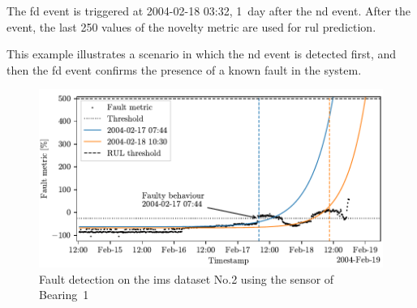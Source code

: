 The \gls{fd} event is triggered at 2004-02-18 03:32, 1~day after the \gls{nd} event. After the event, the last 250 values of the novelty metric are used for \gls{rul} prediction. 

This example illustrates a scenario in which the \gls{nd} event is detected first, and then the \gls{fd} event confirms the presence of a known fault in the system.

\begin{figure}
    \centering
    \includegraphics{images/IMS/Test02/FD.pdf}
    \caption{Fault detection on the \gls{ims} dataset No.2 using the sensor of Bearing~1}
    \label{fig:IMS_n2_3x_fd}
\end{figure}

